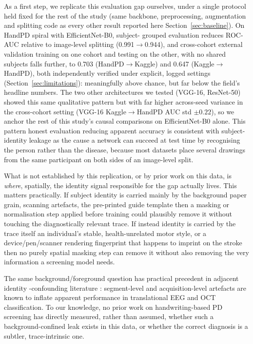\documentclass[3p,final,10pt]{elsarticle}
\begin{document}
As a first step, we replicate this evaluation gap ourselves, under a single
protocol held fixed for the rest of the study (same backbone, preprocessing,
augmentation and splitting code as every other result reported here
Section~\ref{sec:baseline}). On HandPD spiral with EfficientNet-B0, subject-
grouped evaluation reduces ROC-AUC relative to image-level splitting
(0.991$\to$0.944), and cross-cohort external validation training on one
cohort and testing on the other, with no shared subjects falls further,
to 0.703 (HandPD$\to$Kaggle) and 0.647 (Kaggle$\to$HandPD), both
independently verified under explicit, logged settings
(Section~\ref{sec:limitations}): meaningfully
above chance, but far below the field's headline numbers. The two other
architectures we tested (VGG-16, ResNet-50) showed this same qualitative
pattern but with far higher across-seed variance in the cross-cohort setting
(VGG-16 Kaggle$\to$HandPD AUC std $\pm0.22$), so we anchor the rest of this
study's causal comparisons on EfficientNet-B0 alone. This pattern honest
evaluation reducing apparent accuracy is consistent with subject-identity
leakage as the cause a network can succeed at test time by recognising the
person rather than the disease, because most datasets place several
drawings from the same participant on both sides of an image-level split.

What is not established by this replication, or by prior work on this
data, is \emph{where}, spatially, the identity signal responsible for the
gap actually lives. This matters practically. If subject identity is carried mainly by the background
paper grain, scanning artefacts, the pre-printed guide template then a
masking or normalisation step applied before training could plausibly
remove it without touching the diagnostically relevant trace. If instead
identity is carried by the trace itself an individual's stable,
health-unrelated motor style, or a device/pen/scanner rendering fingerprint
that happens to imprint on the stroke then no purely spatial masking
step can remove it without also removing the very information a screening
model needs.

The same background/foreground question has practical precedent in
adjacent identity \hyp confounding literature \cite{chaibubneto2019,tampu2022}:
segment-level and acquisition-level artefacts are known to inflate
apparent performance in translational EEG and OCT classification. To our
knowledge, no prior work on handwriting-based PD screening has directly
measured, rather than assumed, whether such a background-confined leak
exists in this data, or whether the correct diagnosis is a subtler,
trace-intrinsic one.
\end{document}
